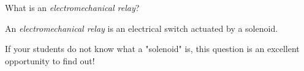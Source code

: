 

What is an {\it electromechanical relay}?







An {\it electromechanical relay} is an electrical switch actuated by a solenoid.







If your students do not know what a "solenoid" is, this question is an excellent opportunity to find out!




